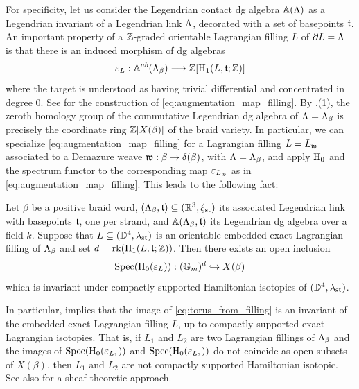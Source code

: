 For specificity, let us consider the Legendrian contact dg algebra $\mathbb{A}(\La)$ as a Legendrian invariant of a Legendrian link $\La$, decorated with a set of basepoints $\tt$. An important property of a $\Z$-graded orientable Lagrangian filling $L$ of $\dd L=\La$ is that there is an induced morphism of dg algebras
\begin{equation}\label{eq:augmentation_map_filling}
\varepsilon_L:\mathbb{A}^{ab}(\La_\beta)\lr\Z[\hH_1(L,\tt;\Z)]
\end{equation}
\noindent where the target is understood as having trivial differential and concentrated in degree 0. See \cite[Theorem 6.8]{EtnyreNg22_Survey} for the construction of \eqref{eq:augmentation_map_filling}. By .(1), the zeroth homology group of the commutative Legendrian dg algebra of $\La=\La_\beta$ is precisely the coordinate ring $\Z[X(\beta)]$ of the braid variety. In particular, we can specialize \eqref{eq:augmentation_map_filling} for a Lagrangian filling $L=L_\w$ associated to a Demazure weave $\w:\beta\to\delta(\beta)$, with $\La=\La_\beta$, and apply $\hH_0$ and the spectrum functor to the corresponding map $\varepsilon_{L_\w}$ as in \eqref{eq:augmentation_map_filling}. This leads to the following fact:

\begin{proposition}\label{prop:torus_from_filling} Let $\beta$ be a positive braid word, $(\La_\beta,\tt)\sse(\R^3,\xi_\std)$ its associated Legendrian link with basepoints $\tt$, one per strand, and $\mathbb{A}(\La_\beta,\tt)$ its Legendrian dg algebra over a field $k$. Suppose that $L\sse(\D^4,\la_\std)$ is an orientable embedded exact Lagrangian filling of $\La_\beta$ and set $d=\mbox{rk}(\hH_1(L,\tt;\Z))$. Then there exists an open inclusion
    \begin{equation}\label{eq:torus_from_filling}
        \Spec(\hH_0(\varepsilon_{L})):(\bG_m)^d\hookrightarrow X(\beta)
    \end{equation}
    which is invariant under compactly supported Hamiltonian isotopies of $(\D^4,\la_\std)$.\sbs
\end{proposition}

In particular,  implies that the image of \eqref{eq:torus_from_filling} is an invariant of the embedded exact Lagrangian filling $L$, up to compactly supported exact Lagrangian isotopies. That is, if $L_1$ and $L_2$ are two Lagrangian fillings of $\La_\beta$ and the images of $\Spec(\hH_0(\varepsilon_{L_1}))$ and $\Spec(\hH_0(\varepsilon_{L_2}))$ do not coincide as open subsets of $X(\beta)$, then $L_1$ and $L_2$ are not compactly supported Hamiltonian isotopic. See also \cite{LiCobordism1,li2024lagrangiancobordismfunctormicrolocal} for a sheaf-theoretic approach.\\


